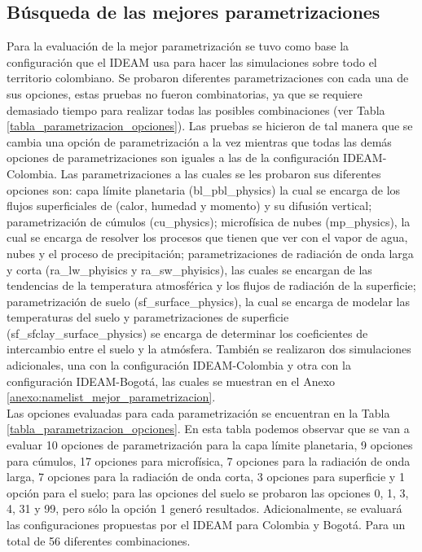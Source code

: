 \begin{itemize}
\section{Búsqueda de las mejores parametrizaciones}
\label{busqueda_mejores_param}

Para la evaluación de la mejor parametrización se tuvo como base la configuración que el IDEAM usa para hacer las simulaciones sobre todo el territorio colombiano. Se probaron diferentes parametrizaciones con cada una de sus opciones, estas pruebas no fueron combinatorias, ya que se requiere demasiado tiempo para realizar todas las posibles combinaciones (ver Tabla \ref{tabla_parametrizacion_opciones}). Las pruebas se hicieron de tal manera que se cambia una opción de parametrización a la vez mientras que todas las demás opciones de parametrizaciones son iguales a las de la configuración IDEAM-Colombia. Las parametrizaciones a las cuales se les probaron sus diferentes opciones son: capa límite planetaria (bl\_pbl\_physics) la cual se encarga de los flujos superficiales de (calor, humedad y momento) y su difusión vertical; parametrización de cúmulos (cu\_physics); microfísica de nubes (mp\_physics), la cual se encarga de resolver los procesos que tienen que ver con el vapor de agua, nubes y el proceso de precipitación; parametrizaciones de radiación de onda larga y corta (ra\_lw\_phyisics y ra\_sw\_phyisics), las cuales se encargan de las tendencias de la temperatura atmosférica y los flujos de radiación de la superficie; parametrización de suelo (sf\_surface\_physics), la cual se encarga de modelar las temperaturas del suelo y parametrizaciones de superficie (sf\_sfclay\_surface\_physics) se encarga de determinar los coeficientes de intercambio entre el suelo y la atmósfera. También se realizaron dos simulaciones adicionales, una con la configuración IDEAM-Colombia y otra con la configuración IDEAM-Bogotá, las cuales se muestran en el Anexo \ref{anexo:namelist_mejor_parametrizacion}.\\


Las opciones evaluadas para cada parametrización se encuentran en la Tabla \ref{tabla_parametrizacion_opciones}. En esta tabla podemos observar que se van a evaluar 10 opciones de parametrización para la capa límite planetaria, 9 opciones para cúmulos, 17 opciones para microfísica, 7 opciones para la radiación de onda larga, 7 opciones para la radiación de onda corta, 3 opciones para superficie y 1 opción para el suelo; para las opciones del suelo se probaron las opciones 0, 1, 3, 4, 31 y 99, pero sólo la opción 1 generó resultados. Adicionalmente, se evaluará las configuraciones propuestas por el IDEAM para Colombia y Bogotá. Para un total de 56 diferentes combinaciones.


\end{itemize}

